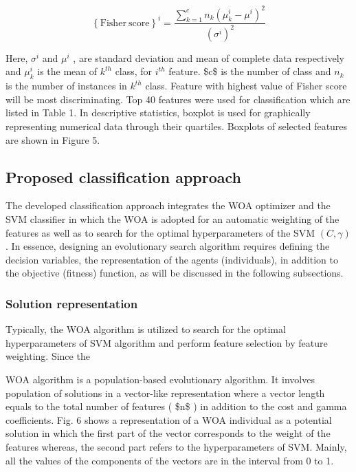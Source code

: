 \begin{equation}
\left\{{\mathrm{Fisher~score}}\right\}^{i}=\frac{\sum_{k=1}^{c}n_{k}(\mu_{k}^{i}-\mu^{i})^{2}}{(\sigma^{i})^{2}}
\end{equation}

Here, $\sigma^{i}$ and $\mu^{i}$ , are standard deviation and mean of complete data respectively and $\mu_{k}^{i}$ is the mean of $k^{t h}$ class, for $i^{t h}$ feature. \$c\$ is the number of class and $n_{k}$ is the number of instances in $k^{t h}$ class. Feature with highest value of Fisher score will be most discriminating. Top 40 features were used for classification which are listed in Table 1. In descriptive statistics, boxplot is used for graphically representing numerical data through their quartiles. Boxplots of selected features are shown in Figure 5.

\subsection{Proposed classification approach}

The developed classification approach integrates the WOA optimizer and the SVM classifier in which the WOA is adopted for an automatic weighting of the features as well as to search for the optimal hyperparameters of the SVM $(C,\gamma)$ . In essence, designing an evolutionary search algorithm requires defining the decision variables, the representation of the agents (individuals), in addition to the objective (fitness) function, as will be discussed in the following subsections.

\subsubsection{Solution representation}

Typically, the WOA algorithm is utilized to search for the optimal hyperparameters of SVM algorithm and perform feature selection by feature weighting. Since the

WOA algorithm is a population-based evolutionary algorithm. It involves population of solutions in a vector-like representation where a vector length equals to the total number of features ( \$n\$ ) in addition to the cost and gamma coefficients. Fig. 6 shows a representation of a WOA individual as a potential solution in which the first part of the vector corresponds to the weight of the features whereas, the second part refers to the hyperparameters of SVM. Mainly, all the values of the components of the vectors are in the interval from 0 to 1.

